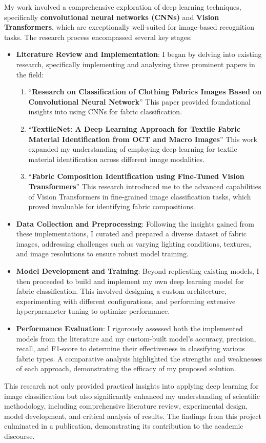 My work involved a comprehensive exploration of deep learning techniques, specifically \textbf{convolutional neural networks (CNNs)} and \textbf{Vision Transformers}, which are exceptionally well-suited for image-based recognition tasks. The research process encompassed several key stages:
\begin{itemize}
    \item \textbf{Literature Review and Implementation}: I began by delving into existing research, specifically implementing and analyzing three prominent papers in the field:
    \begin{enumerate}
        \item ``\textbf{Research on Classification of Clothing Fabrics Images Based on Convolutional Neural Network}'' This paper provided foundational insights into using CNNs for fabric classification.
        \item ``\textbf{TextileNet: A Deep Learning Approach for Textile Fabric Material Identification from OCT and Macro Images}'' This work expanded my understanding of employing deep learning for textile material identification across different image modalities.
        \item ``\textbf{Fabric Composition Identification using Fine-Tuned Vision Transformers}'' This research introduced me to the advanced capabilities of Vision Transformers in fine-grained image classification tasks, which proved invaluable for identifying fabric compositions.
    \end{enumerate}
    \item \textbf{Data Collection and Preprocessing}: Following the insights gained from these implementations, I curated and prepared a diverse dataset of fabric images, addressing challenges such as varying lighting conditions, textures, and image resolutions to ensure robust model training.
    \item \textbf{Model Development and Training}: Beyond replicating existing models, I then proceeded to build and implement my own deep learning model for fabric classification. This involved designing a custom architecture, experimenting with different configurations, and performing extensive hyperparameter tuning to optimize performance.
    \item \textbf{Performance Evaluation}: I rigorously assessed both the implemented models from the literature and my custom-built model's accuracy, precision, recall, and F1-score to determine their effectiveness in classifying various fabric types. A comparative analysis highlighted the strengths and weaknesses of each approach, demonstrating the efficacy of my proposed solution.
\end{itemize}
This research not only provided practical insights into applying deep learning for image classification but also significantly enhanced my understanding of scientific methodology, including comprehensive literature review, experimental design, model development, and critical analysis of results. The findings from this project culminated in a publication, demonstrating its contribution to the academic discourse.

